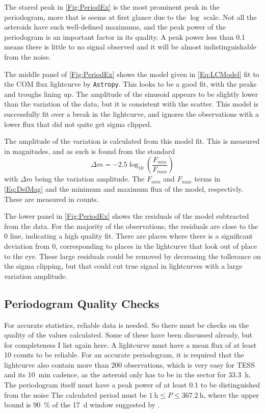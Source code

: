 \documentclass{UCreport}
\begin{document}
The stared peak in \autoref{Fig:PeriodEx} is  the most prominent peak in the periodogram, more that is seems at first glance due to the $\log$ scale.
Not all the asteroids have such well-defined maximums, and the peak power of the periodogram is an important factor in its quality.
A peak power less than 0.1 means there is little to no signal observed and it will be almost indistinguishable from the noise.

The middle panel of \autoref{Fig:PeriodEx} shows the model given in \autoref{Eq:LCModel} fit to the COM flux lightcurve by \texttt{Astropy}.
This looks to be a good fit, with the peaks and troughs lining up.
The amplitude of the sinusoid appears to be slightly lower than the variation of the data, but it is consistent with the scatter.
This model is successfully fit over a break in the lightcurve, and ignores the observations with a lower flux that did not quite get sigma clipped.

The amplitude of the variation is calculated from this model fit.
This is measured in magnitudes, and as such is found from the standard
\begin{equation} \label{Eq:DelMag}
  \Delta m = -2.5 \log_{10}(\frac{F_{min}}{F_{max}})
\end{equation}
with $\Delta m$ being the variation amplitude.
The $F_{min}$ and $F_{max}$ terms in \autoref{Eq:DelMag} and the minimum and maximum flux of the model, respectivly.
These are measured in counts.

The lower panel in \autoref{Fig:PeriodEx} shows the residuals of the model subtracted from the data.
For the majority of the observations, the residuals are close to the 0 line, indicating a high quality fit.
There are places where there is a significant deviation from 0, corresponding to places in the lightcurve that look out of place to the eye. 
These large residuals could be removed by decreasing the tollerance on the sigma clipping, but that could cut true signal in lightcurves with a large variation amplitude. 


\subsection{Periodogram Quality Checks}\label{SubSec:QualCheck}

For accurate statistics, reliable data is needed.
So there must be checks on the quality of the values calculated.
Some of these have been discussed already, but for completeness I list again here.
A lightcurve must have a mean flux of at least 10 counts to be reliable.
For an accurate periodogram, it is required that the lightcurve also contain more than 200 observations, which is very easy for TESS and its \qty{10}{\minute} cadence, as the asteroid only has to be in the sector for \qty{33.3}{\hour}.
The periodogram itself must have a peak power of at least 0.1 to be distinguished from the noise
The calculated period must be $\qty{1}{\hour}\leq P \leq \qty{367.2}{\hour}$, where the upper bound is \qty{90}{\percent} of the \qty{17}{\day} window suggested by \cite{McNeill2023}.
\end{document}

